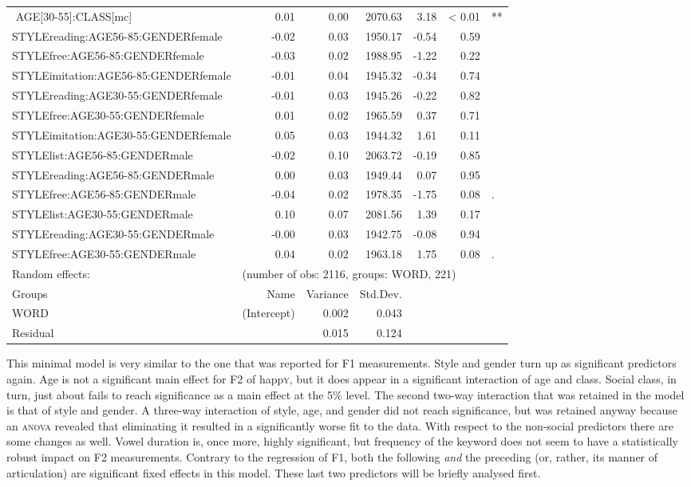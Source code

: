 {\begin{longtable}[c]{p{}rrrrrl}
$$		AGE[30-55]:CLASS[mc] & 0.01 & 0.00 & 2070.63 & 3.18 & < 0.01 & ** \\ 
		STYLEreading:AGE56-85:GENDERfemale & -0.02 & 0.03 & 1950.17 & -0.54 & 0.59 & \\ 
		STYLEfree:AGE56-85:GENDERfemale & -0.03 & 0.02 & 1988.95 & -1.22 & 0.22 & \\ 
		STYLEimitation:AGE56-85:GENDERfemale & -0.01 & 0.04 & 1945.32 & -0.34 & 0.74 & \\ 
		STYLEreading:AGE30-55:GENDERfemale & -0.01 & 0.03 & 1945.26 & -0.22 & 0.82 & \\ 
		STYLEfree:AGE30-55:GENDERfemale & 0.01 & 0.02 & 1965.59 & 0.37 & 0.71 & \\ 
		STYLEimitation:AGE30-55:GENDERfemale & 0.05 & 0.03 & 1944.32 & 1.61 & 0.11 & \\ 
		STYLElist:AGE56-85:GENDERmale & -0.02 & 0.10 & 2063.72 & -0.19 & 0.85 & \\ 
		STYLEreading:AGE56-85:GENDERmale & 0.00 & 0.03 & 1949.44 & 0.07 & 0.95 & \\ 
		STYLEfree:AGE56-85:GENDERmale & -0.04 & 0.02 & 1978.35 & -1.75 & 0.08 & .\\ 
		STYLElist:AGE30-55:GENDERmale & 0.10 & 0.07 & 2081.56 & 1.39 & 0.17 & \\ 
		STYLEreading:AGE30-55:GENDERmale & -0.00 & 0.03 & 1942.75 & -0.08 & 0.94 & \\ 
		STYLEfree:AGE30-55:GENDERmale & 0.04 & 0.02 & 1963.18 & 1.75 & 0.08 & .\\ 
		\hline
		Random effects: & \multicolumn{6}{l}{(number of obs: 2116, groups: WORD, 221)} \\
		Groups &         Name & Variance &      Std.Dev. & & & \\
		WORD &  (Intercept) & 0.002 & 0.043 & & & \\
		Residual  &         & 0.015 & 0.124 & & & \\
		\hline
	\end{longtable}
}

This minimal model is very similar to the one that was reported for F1 measurements.
Style and gender turn up as significant predictors again.
Age is not a significant main effect for F2 of happ\textsc{y}, but it does appear in a significant interaction of age and class.
Social class, in turn, just about fails to reach significance as a main effect at the 5\% level.
The second two-way interaction that was retained in the model is that of style and gender.
A three-way interaction of style, age, and gender did not reach significance, but was retained anyway because an \textsc{anova} revealed that eliminating it resulted in a significantly worse fit to the data.
With respect to the non-social predictors there are some changes as well.
Vowel duration is, once more, highly significant, but frequency of the keyword does not seem to have a statistically robust impact on F2 measurements.
Contrary to the regression of F1, both the following \emph{and} the preceding  (or, rather, its manner of articulation) are significant fixed effects in this model.
These last two predictors will be briefly analysed first.

